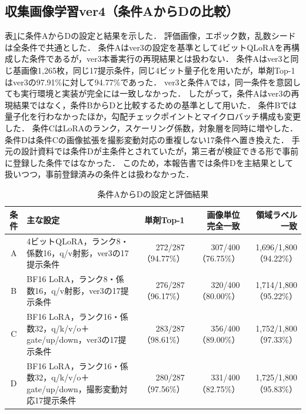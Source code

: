 \documentclass[uplatex,dvipdfmx]{jsarticle}
\begin{document}
\subsection{収集画像学習ver4（条件AからDの比較）}\label{sec:ver4_conditions}

表\ref{tab:conditions}に条件AからDの設定と結果を示した．
評価画像，エポック数，乱数シードは全条件で共通とした．
条件Aはver3の設定を基準として4ビットQLoRAを再構成した条件であるが，ver3本番実行の再現結果とは扱わない．
条件Aはver3と同じ基画像1,265枚，同じ17提示条件，同じ4ビット量子化を用いたが，単剤Top-1はver3の97.91\%に対して94.77\%であった．
ver3と条件Aでは，同一条件を意図しても実行環境と実装が完全には一致しなかった．
したがって，条件Aはver3の再現結果ではなく，条件BからDと比較するための基準として用いた．
条件Bでは量子化を行わなかったほか，勾配チェックポイントとマイクロバッチ構成も変更した．
条件CはLoRAのランク，スケーリング係数，対象層を同時に増やした．
条件Dは条件Cの画像拡張を撮影変動対応の重複しない17条件へ置き換えた．
手元の設計資料では条件Dが主条件とされていたが，第三者が検証できる形で事前に登録した条件ではなかった．
このため，本報告書では条件Dを主結果として扱いつつ，事前登録済みの条件とは扱わなかった．

\begin{table}[H]
  \centering
  \caption{条件AからDの設定と評価結果}
  \label{tab:conditions}
  \scriptsize
  \begin{tabular}{|c|p{4.9cm}|r|r|r|}
    \hline
    条件 & 主な設定 & 単剤Top-1 & \shortstack{画像単位\\完全一致} & \shortstack{領域ラベル\\一致} \\ \hline
    A & 4ビットQLoRA，ランク8・係数16，q/v射影，ver3の17提示条件 & 272/287（94.77\%） & 307/400（76.75\%） & 1,696/1,800（94.22\%） \\ \hline
    B & BF16 LoRA，ランク8・係数16，q/v射影，ver3の17提示条件 & 276/287（96.17\%） & 320/400（80.00\%） & 1,714/1,800（95.22\%） \\ \hline
    C & BF16 LoRA，ランク16・係数32，q/k/v/o＋gate/up/down，ver3の17提示条件 & 283/287（98.61\%） & 356/400（89.00\%） & 1,752/1,800（97.33\%） \\ \hline
    D & BF16 LoRA，ランク16・係数32，q/k/v/o＋gate/up/down，撮影変動対応17提示条件 & 280/287（97.56\%） & 331/400（82.75\%） & 1,725/1,800（95.83\%） \\ \hline
  \end{tabular}
\end{table}
\end{document}
